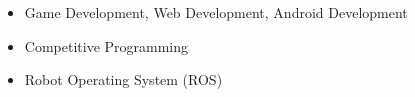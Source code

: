 
{\fontsize{11pt}{1em}\bodyfontlight\upshape\color{text}
  \begin{itemize}
  \item Game Development, Web Development, Android Development
  \item Competitive Programming
  \item Robot Operating System (ROS)
  \end{itemize}
}